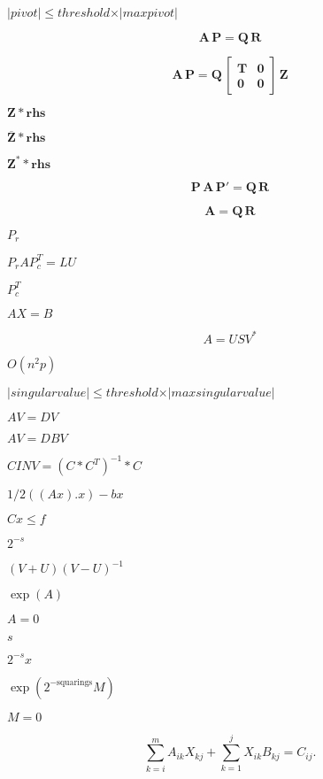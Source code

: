 \documentclass{article}
\begin{document}
$ \vert pivot \vert \leqslant threshold \times \vert maxpivot \vert $
\pagebreak

\[
 \mathbf{A} \, \mathbf{P} = \mathbf{Q} \, \mathbf{R}
\]
\pagebreak

\[
 \mathbf{A} \, \mathbf{P} = \mathbf{Q} \,
                    \begin{bmatrix} \mathbf{T} &  \mathbf{0} \\
                                    \mathbf{0} & \mathbf{0} \end{bmatrix} \, \mathbf{Z}
\]
\pagebreak

$ \mathbf{Z} * \mathbf{rhs} $
\pagebreak

$ \mathbf{\overline Z} * \mathbf{rhs} $
\pagebreak

$ \mathbf{Z}^* * \mathbf{rhs} $
\pagebreak

\[
 \mathbf{P} \, \mathbf{A} \, \mathbf{P}' = \mathbf{Q} \, \mathbf{R}
\]
\pagebreak

\[
 \mathbf{A} = \mathbf{Q} \, \mathbf{R}
\]
\pagebreak

$ P_r $
\pagebreak

$P_r A P_c^T = L U$
\pagebreak

$ P_c^T $
\pagebreak

$ A X = B $
\pagebreak

\[ A = U S V^* \]
\pagebreak

$ O(n^2p) $
\pagebreak

$ \vert singular value \vert \leqslant threshold \times \vert max singular value \vert $
\pagebreak

$ A V = D V $
\pagebreak

$ A V = D B V $
\pagebreak

$ CINV = (C * C^T)^{-1} * C $
\pagebreak

$ 1/2((Ax).x) - bx $
\pagebreak

$ Cx \le f $
\pagebreak

$ 2^{-s} $
\pagebreak

$ (V+U)(V-U)^{-1} $
\pagebreak

$ \exp(A) $
\pagebreak

$ A = 0 $
\pagebreak

$ s $
\pagebreak

$ 2^{-s} x $
\pagebreak

$ \exp(2^{-\mbox{squarings}}M) $
\pagebreak

$ M = 0 $
\pagebreak

\[ 
    \sum_{k=i}^m A_{ik} X_{kj} + \sum_{k=1}^j X_{ik} B_{kj} = C_{ij}. 
\]
\pagebreak
\end{document}
